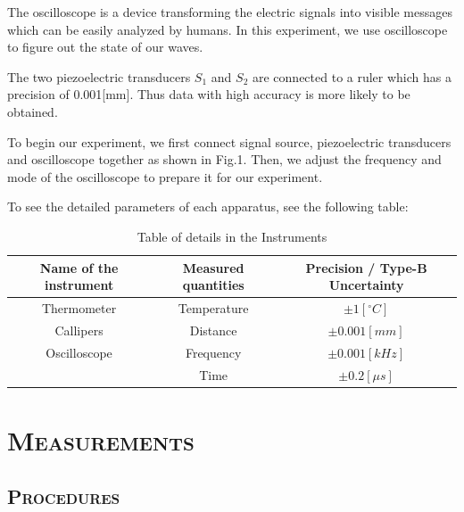 \documentclass[a4paper,12pt]{article}
\begin{document}
The oscilloscope is a device transforming the electric signals into visible messages which can be easily analyzed by humans. In this experiment, we use oscilloscope to figure out the state of our waves. \par
The two piezoelectric transducers \textit{$S_1$} and \textit{$S_2$} are connected to a ruler which has a precision of 0.001[mm]. Thus data with high accuracy is more likely to be obtained.\par
To begin our experiment, we first connect signal source, piezoelectric transducers and oscilloscope together as shown in Fig.1. Then, we adjust the frequency and mode of the oscilloscope to prepare it for our experiment.\par
To see the detailed parameters of each apparatus, see the following table:

\begin{table}[h]
\begin{tabular}{ccc}
\hline
Name of the instrument & Measured quantities & Precision / Type-B Uncertainty\\
\hline
Thermometer & Temperature & $\pm 1[^{\circ}C]$\\
Callipers & Distance & $\pm 0.001 [mm]$\\
Oscilloscope & Frequency & $\pm 0.001 [kHz]$\\
& Time & $\pm 0.2 [\mu s]$\\
\hline
\end{tabular}
\caption{Table of details in the Instruments}
\end{table}

\section{\textsc{Measurements}}
\subsection{\textsc{Procedures \cite{labmanual}}}
\end{document}
